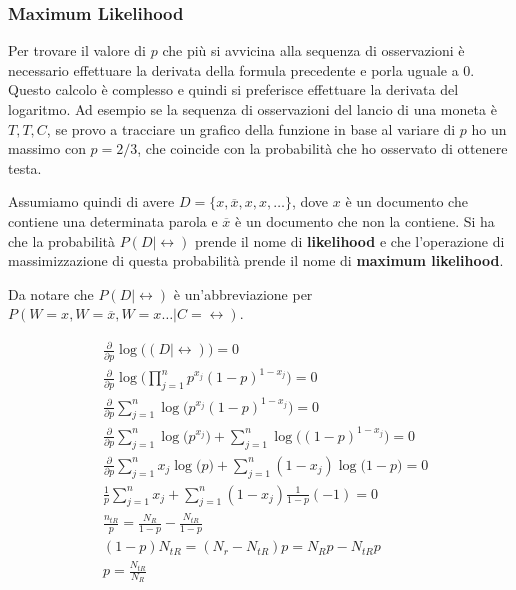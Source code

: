 
\subsubsection{Maximum Likelihood}

Per trovare il valore di $p$ che più si avvicina alla sequenza di osservazioni è necessario effettuare la derivata della formula precedente e porla uguale a 0. Questo calcolo è complesso e quindi si preferisce effettuare la derivata del logaritmo.
Ad esempio se la sequenza di osservazioni del lancio di una moneta è $T,T, C$, se provo a tracciare un grafico della funzione in base al variare di $p$ ho un massimo con $p = 2/3$, che coincide con la probabilità che ho osservato di ottenere testa.

Assumiamo quindi di avere $D = \{x, \overline{x}, x, x, \ldots \}$, dove $x$ è un documento che contiene una determinata parola e $\overline{x}$ è un documento che non la contiene.
Si ha che la probabilità $P(D|\rel)$ prende il nome di \textbf{likelihood} e che l'operazione di massimizzazione di questa probabilità prende il nome di \textbf{maximum likelihood}.

Da notare che $P(D|\rel)$ è un'abbreviazione per $P(W = x, W = \overline{x}, W = x \ldots | C = \rel)$.

\begin{align}
	&\frac{\partial}{\partial p} \log \Big( (D|\rel) \Big) = 0\nonumber\\
	&\frac{\partial}{\partial p} \log \Big( \prod\limits_{j = 1}^n p^{x_j}(1-p)^{1-x_j} \Big) = 0\nonumber\\
	&\frac{\partial}{\partial p} \sum\limits_{j = 1}^n \log \Big( p^{x_j}(1-p)^{1-x_j} \Big) = 0 \nonumber\\
	&\frac{\partial}{\partial p} \sum\limits_{j = 1}^n \log \Big( p^{x_j}\Big) + \sum\limits_{j = 1}^n \log \Big((1-p)^{1-x_j} \Big) = 0 \nonumber\\
	&\frac{\partial}{\partial p} \sum\limits_{j = 1}^n x_j \log \Big( p\Big) + \sum\limits_{j = 1}^n (1-x_j)\log \Big(1-p \Big) = 0 \nonumber\\
	&\frac{1}{p}\sum\limits_{j = 1}^n x_j + \sum\limits_{j = 1}^n (1-x_j) \frac{1}{1-p}(-1)= 0 \nonumber\\
	&\frac{n_{tR}}{p}  =  \frac{N_R}{1-p} - \frac{N_{tR}}{1-p} \nonumber\\
	&(1-p)N_{tR} = (N_r - N_{tR}) p  = N_Rp - N_{tR}p \nonumber\\
	&\boxed{p = \frac{N_{tR}}{N_R}}
\end{align}

